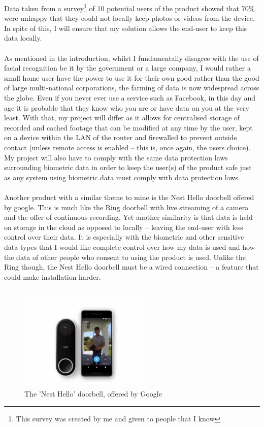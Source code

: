 \documentclass[9pt]{article}
\begin{document}
Data taken from a survey\footnote{This survey was created by me and given to people that I know} of 10 potential users of the product showed that 70\% were unhappy that they could not locally keep photos or videos from the device. In spite of this, I will ensure that my solution allows the end-user to keep this data locally.\\\\
As mentioned in the introduction, whilst I fundamentally disagree with the use of facial recognition be it by the government or a large company, I would rather a small home user have the power to use it for their own good rather than the good of large multi-national corporations, the farming of data is now widespread across the globe. Even if you never ever use a service such as Facebook, in this day and age it is probable that they know who you are or have data on you at the very least. With that, my project will differ as it allows for centralised storage of recorded and cached footage that can be modified at any time by the user, kept on a device within the LAN of the router and firewalled to prevent outside contact (unless remote access is enabled -- this is, once again, the users choice). My project will also have to comply with the same data protection laws surrounding biometric data in order to keep the user(s) of the product safe just as any system using biometric data must comply with data protection laws.\\\\
Another product with a similar theme to mine is the Nest Hello doorbell offered by google. This is much like the Ring doorbell with live streaming of a camera and the offer of continuous recording. Yet another similarity is that data is held on storage in the cloud as opposed to locally – leaving the end-user with less control over their data. It is especially with the biometric and other sensitive data types that I would like complete control over how my data is used and how the data of other people who consent to using the product is used. Unlike the Ring though, the Nest Hello doorbell must be a wired connection – a feature that could make installation harder.\\\\
\begin{figure}[H]
	\centering
	\includegraphics[width=2.4in]{figs/nestHello}
	\caption{The 'Nest Hello' doorbell, offered by Google}
	\label{fig:nesthello}
\end{figure}
\end{document}
